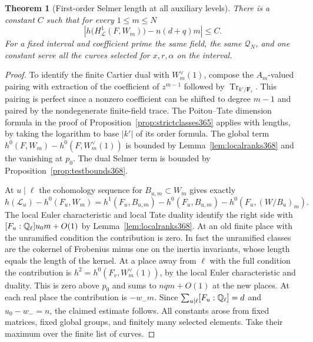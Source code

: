 \documentclass[a4paper,11pt]{article}
\newtheorem{theorem}[proposition]{Theorem}
\theoremstyle{definition}
\theoremstyle{remark}
\numberwithin{equation}{section}
\begin{document}
\begin{theorem}[First-order Selmer length at all auxiliary levels]
\label{thm:selmerlength368}
There is a constant \(C\) such that for every \(1\le m\le N\)
\[
 \left|h\bigl(H^1_{\mathcal L}(F,W_m)\bigr)
                 - n(d+q)m\right|\le C .
\]
For a fixed interval and coefficient prime the same field,
the same \(\mathcal Q_N\), and one constant serve all the
curves selected for \(x,r,\alpha\) on the interval.
\end{theorem}
\begin{proof}
To identify the finite Cartier dual with \(W_m^\vee(1)\), compose the \(A_m\)-valued pairing with extraction of the
coefficient of \(z^{m-1}\) followed by
\(\operatorname{Tr}_{k'/\mathbf F_\ell}\). This pairing is
perfect since a nonzero coefficient can be shifted to degree
\(m-1\) and paired by the nondegenerate finite-field trace.
The Poitou--Tate dimension formula in the proof of
Proposition~\ref{prop:strictclasses365} applies with lengths,
by taking the logarithm to base \(|k'|\) of its order formula.
The global term \(h^0(F,W_m)-h^0(F,W_m^\vee(1))\) is bounded
by Lemma~\ref{lem:localranks368} and the vanishing at \(p_0\).
The dual Selmer term is bounded by
Proposition~\ref{prop:testbounds368}.~\cite{VII-V-V-milne98}

At \(u\mid\ell\) the cohomology sequence for \(B_{u,m}\subset W_m\)
gives exactly
\[
 h(\mathcal L_u)-h^0(F_u,W_m)
 =h^1(F_u,B_{u,m})-h^0(F_u,B_{u,m})
                    -h^0(F_u,(W/B_u)_m).
\]
The local Euler characteristic and local Tate duality identify
the right side with \([F_u:\mathbb Q_\ell]u_0m+O(1)\) by
Lemma~\ref{lem:localranks368}. At an old finite place with the
unramified condition the contribution is zero. In fact the
unramified classes are the cokernel of Frobenius minus one on
the inertia invariants, whose length equals the length of
the kernel. At a place away from \(\ell\) with the full condition
the contribution is \(h^2=h^0(F_v,W_m^\vee(1))\), by the
local Euler characteristic and duality. This is zero above
\(p_0\) and sums to \(nqm+O(1)\) at the new places. At each
real place the contribution is \(-w_-m\). Since
\(\sum_{u\mid\ell}[F_u:\mathbb Q_\ell]=d\) and \(u_0-w_-=n\),
the claimed estimate follows. All constants arose from fixed
matrices, fixed global groups, and finitely many selected
elements. Take their maximum over the finite list of curves.
\end{proof}
\end{document}
